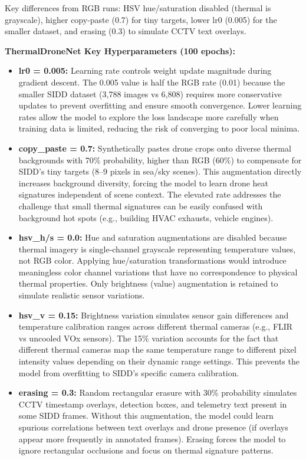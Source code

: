 \documentclass[12pt,a4paper]{report}
\begin{document}
Key differences from RGB runs: HSV hue/saturation disabled (thermal is
grayscale), higher copy-paste (0.7) for tiny targets, lower lr0 (0.005)
for the smaller dataset, and erasing (0.3) to simulate CCTV text overlays.

\textbf{ThermalDroneNet Key Hyperparameters (100 epochs):}
\begin{itemize}
  \item \textbf{lr0 = 0.005:} Learning rate controls weight update magnitude during gradient descent. The 0.005 value is half the RGB rate (0.01) because the smaller SIDD dataset (3,788 images vs 6,808) requires more conservative updates to prevent overfitting and ensure smooth convergence. Lower learning rates allow the model to explore the loss landscape more carefully when training data is limited, reducing the risk of converging to poor local minima.
  \item \textbf{copy\_paste = 0.7:} Synthetically pastes drone crops onto diverse thermal backgrounds with 70\% probability, higher than RGB (60\%) to compensate for SIDD's tiny targets (8--9 pixels in sea/sky scenes). This augmentation directly increases background diversity, forcing the model to learn drone heat signatures independent of scene context. The elevated rate addresses the challenge that small thermal signatures can be easily confused with background hot spots (e.g., building HVAC exhausts, vehicle engines).
  \item \textbf{hsv\_h/s = 0.0:} Hue and saturation augmentations are disabled because thermal imagery is single-channel grayscale representing temperature values, not RGB color. Applying hue/saturation transformations would introduce meaningless color channel variations that have no correspondence to physical thermal properties. Only brightness (value) augmentation is retained to simulate realistic sensor variations.
  \item \textbf{hsv\_v = 0.15:} Brightness variation simulates sensor gain differences and temperature calibration ranges across different thermal cameras (e.g., FLIR vs uncooled VOx sensors). The 15\% variation accounts for the fact that different thermal cameras map the same temperature range to different pixel intensity values depending on their dynamic range settings. This prevents the model from overfitting to SIDD's specific camera calibration.
  \item \textbf{erasing = 0.3:} Random rectangular erasure with 30\% probability simulates CCTV timestamp overlays, detection boxes, and telemetry text present in some SIDD frames. Without this augmentation, the model could learn spurious correlations between text overlays and drone presence (if overlays appear more frequently in annotated frames). Erasing forces the model to ignore rectangular occlusions and focus on thermal signature patterns.

\end{itemize}
\end{document}
